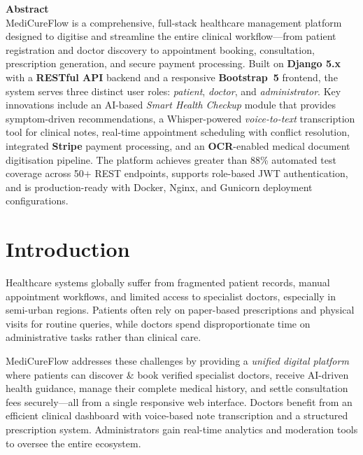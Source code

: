 \documentclass[10pt,twocolumn]{article}
\begin{document}
\noindent
{\bfseries Abstract}\\[3pt]
MediCureFlow is a comprehensive, full-stack healthcare management platform designed to
digitise and streamline the entire clinical workflow—from patient registration and doctor
discovery to appointment booking, consultation, prescription generation, and secure
payment processing. Built on \textbf{Django 5.x} with a \textbf{RESTful API} backend
and a responsive \textbf{Bootstrap~5} frontend, the system serves three distinct user
roles: \textit{patient}, \textit{doctor}, and \textit{administrator}. Key innovations
include an AI-based \textit{Smart Health Checkup} module that provides symptom-driven
recommendations, a Whisper-powered \textit{voice-to-text} transcription tool for
clinical notes, real-time appointment scheduling with conflict resolution, integrated
\textbf{Stripe} payment processing, and an \textbf{OCR}-enabled medical document
digitisation pipeline. The platform achieves greater than 88\% automated test coverage
across 50$+$ REST endpoints, supports role-based JWT authentication, and is production-ready
with Docker, Nginx, and Gunicorn deployment configurations.

\vspace{6pt}

\section{Introduction}

Healthcare systems globally suffer from fragmented patient records, manual
appointment workflows, and limited access to specialist doctors, especially in
semi-urban regions. Patients often rely on paper-based prescriptions and physical
visits for routine queries, while doctors spend disproportionate time on
administrative tasks rather than clinical care.

MediCureFlow addresses these challenges by providing a \textit{unified digital
platform} where patients can discover & book verified specialist doctors, receive
AI-driven health guidance, manage their complete medical history, and settle
consultation fees securely—all from a single responsive web interface. Doctors
benefit from an efficient clinical dashboard with voice-based note transcription and
a structured prescription system. Administrators gain real-time analytics and
moderation tools to oversee the entire ecosystem.
\end{document}

